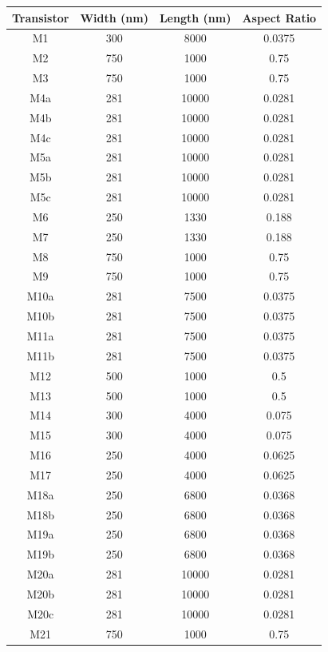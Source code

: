 \documentclass[journal]{IEEEtran}
\begin{document}
\begin{table}
\centering
\label{tab:trans_sizes}
\begin{tabular}{|c|c|c|c|}
\hline Transistor & Width (nm) & Length (nm) & Aspect Ratio \\ 
\hline M1 & 300 & 8000 & 0.0375 \\ 
\hline M2 & 750 & 1000 & 0.75 \\ 
\hline M3 & 750 & 1000 & 0.75 \\ 
\hline M4a & 281 & 10000 & 0.0281 \\ 
\hline M4b & 281 & 10000 & 0.0281 \\ 
\hline M4c & 281 & 10000 & 0.0281 \\ 
\hline M5a & 281 & 10000 & 0.0281 \\ 
\hline M5b & 281 & 10000 & 0.0281 \\
\hline M5c & 281 & 10000 & 0.0281  \\
\hline M6 & 250 & 1330 & 0.188 \\
\hline M7 & 250 & 1330 & 0.188 \\
\hline M8 & 750 & 1000 & 0.75 \\
\hline M9 & 750 & 1000 & 0.75 \\
\hline M10a & 281 & 7500 & 0.0375 \\
\hline M10b & 281 & 7500 & 0.0375 \\
\hline M11a & 281 & 7500 & 0.0375  \\
\hline M11b & 281 & 7500 & 0.0375 \\
\hline M12 & 500 & 1000 & 0.5 \\
\hline M13 & 500 & 1000 & 0.5  \\
\hline M14 & 300 & 4000 & 0.075 \\
\hline M15 & 300 & 4000 & 0.075  \\
\hline M16 & 250 & 4000 & 0.0625 \\
\hline M17 & 250 & 4000 & 0.0625  \\
\hline M18a & 250 & 6800 & 0.0368 \\
\hline M18b & 250 & 6800 & 0.0368  \\
\hline M19a & 250 & 6800 & 0.0368 \\
\hline M19b & 250 & 6800 & 0.0368 \\
\hline M20a & 281 & 10000 & 0.0281 \\
\hline M20b & 281 & 10000 & 0.0281  \\
\hline M20c & 281 & 10000 & 0.0281  \\
\hline M21 & 750 & 1000 & 0.75 \\

\end{tabular}
\end{table}
\end{document}
